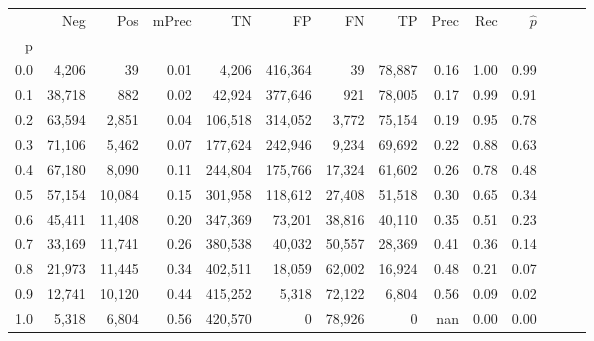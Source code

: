 \begin{tabular}{rrrrrrrrrrrrrr}
\toprule
{} &     Neg &     Pos & mPrec &       TN &       FP &      FN &      TP &  Prec &   Rec & $\hat{p}$ \\
p   &         &         &       &          &          &         &         &       &       &           \\
\midrule
0.0 &   4,206 &      39 &  0.01 &    4,206 &  416,364 &      39 &  78,887 &  0.16 &  1.00 &      0.99 \\
0.1 &  38,718 &     882 &  0.02 &   42,924 &  377,646 &     921 &  78,005 &  0.17 &  0.99 &      0.91 \\
0.2 &  63,594 &   2,851 &  0.04 &  106,518 &  314,052 &   3,772 &  75,154 &  0.19 &  0.95 &      0.78 \\
0.3 &  71,106 &   5,462 &  0.07 &  177,624 &  242,946 &   9,234 &  69,692 &  0.22 &  0.88 &      0.63 \\
0.4 &  67,180 &   8,090 &  0.11 &  244,804 &  175,766 &  17,324 &  61,602 &  0.26 &  0.78 &      0.48 \\
0.5 &  57,154 &  10,084 &  0.15 &  301,958 &  118,612 &  27,408 &  51,518 &  0.30 &  0.65 &      0.34 \\
0.6 &  45,411 &  11,408 &  0.20 &  347,369 &   73,201 &  38,816 &  40,110 &  0.35 &  0.51 &      0.23 \\
0.7 &  33,169 &  11,741 &  0.26 &  380,538 &   40,032 &  50,557 &  28,369 &  0.41 &  0.36 &      0.14 \\
0.8 &  21,973 &  11,445 &  0.34 &  402,511 &   18,059 &  62,002 &  16,924 &  0.48 &  0.21 &      0.07 \\
0.9 &  12,741 &  10,120 &  0.44 &  415,252 &    5,318 &  72,122 &   6,804 &  0.56 &  0.09 &      0.02 \\
1.0 &   5,318 &   6,804 &  0.56 &  420,570 &        0 &  78,926 &       0 &   nan &  0.00 &      0.00 \\
\bottomrule
\end{tabular}
